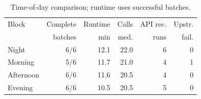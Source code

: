\begin{table}[!ht]
\centering
\caption{Time-of-day comparison; runtime uses successful batches.}
\label{tab:gemini-free-tier-blocks}
\scriptsize
\setlength{\tabcolsep}{3.2pt}
\begin{tabular}{@{}lrrrrr@{}}
\toprule
Block & Complete & Runtime & Calls & API rec. & Upstr. \\
 & batches & min & med. & runs & fail. \\
\midrule
Night & 6/6 & 12.1 & 22.0 & 6 & 0 \\
Morning & 5/6 & 11.7 & 21.0 & 4 & 1 \\
Afternoon & 6/6 & 11.6 & 20.5 & 4 & 0 \\
Evening & 6/6 & 10.5 & 20.5 & 5 & 0 \\
\bottomrule
\end{tabular}
\end{table}
